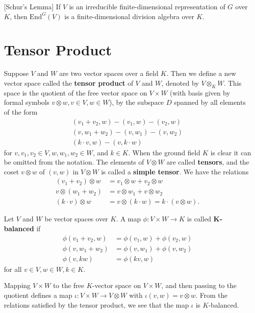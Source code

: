 \begin{thm}\label{schur-lemma}[Schur's Lemma] If $V$ is an irreducible finite-dimensional representation of $G$ over $K$, then $\text{End}^G(V)$ is a finite-dimensional division algebra over $K$.
\end{thm}

\section{Tensor Product}
\begin{defn}
Suppose $V$ and $W$ are two vector spaces over a field $K$. Then we define a new vector space called the \textbf{tensor product} of $V$ and $W$, denoted by $V \otimes_{K} W$.  This space is the quotient of the free vector space on $V \times W$ (with basis given by formal symbols $v \otimes w, v\in V, w \in W$), by the subspace $D$ spanned by all elements of the form
\begin{align*}
(v_1 + v_2, w) - (v_1 , w) - (v_2 , w) \\
(v , w_1 + w_2) - (v , w_1) - (v , w_2) \\
(k \cdot v , w) -( v , k \cdot w)
\end{align*}
for $v, v_1, v_2 \in V, w, w_1, w_2 \in W$, and $k \in K$. When the ground field $K$ is clear it can be omitted from the notation.  The elements of $V \otimes W$ are called \textbf{tensors}, and the coset $v \otimes w$ of $(v,w)$ in $V \otimes W$ is called a \textbf{simple tensor}.  We have the relations
\begin{align*}
(v_1 + v_2) \otimes w &= v_1 \otimes w + v_2 \otimes w \\
v \otimes (w_1 + w_2) &= v \otimes w_1 + v \otimes w_2 \\
(k \cdot v) \otimes w &= v \otimes (k \cdot w) = k \cdot (v \otimes w).
\end{align*}
\end{defn}

\begin{defn}
Let $V$ and $W$ be vector spaces over $K$.  A map $\phi \colon V \times W \to K$ is called $\mathbf{K}$\textbf{-balanced} if \begin{align*}
\phi( v_1 + v_2, w) &= \phi(v_1, w) + \phi(v_2, w) \\
\phi(v, w_1 + w_2) &= \phi (v, w_1) + \phi(v, w_2) \\
\phi(v, kw) &= \phi( kv, w)
\end{align*}
for all $v \in V, w \in W, k \in K$.
\end{defn}
\begin{example}
Mapping $V \times W$ to the free $K$-vector space on $V \times W$, and then passing to the quotient defines a map $\iota \colon V \times W \to V \otimes W$ with $\iota (v,w) = v \otimes w$.  From the relations satisfied by the tensor product, we see that the map $\iota$ is $K$-balanced.
\end{example}

